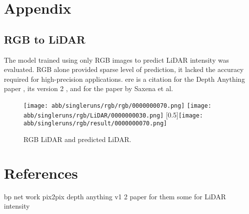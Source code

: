 \section{Appendix}
\subsection{RGB to LiDAR}

The model trained using only RGB images to predict LiDAR intensity was evaluated. RGB alone provided sparse level of prediction, it lacked the accuracy required for high-precision applications. ere is a citation for the Depth Anything paper \cite{depthanything}, its version 2 \cite{depth_anything_v2}, and for the paper by Saxena et al. \cite{saxena2008depth}
\begin{figure}[!ht]
	\centering
	\texttt{[image: abb/singleruns/rgb/rgb/0000000070.png]}
	\texttt{[image: abb/singleruns/rgb/LiDAR/0000000030.png]}
	\scalebox{2}[0.5]{\texttt{[image: abb/singleruns/rgb/result/0000000070.png]}}
	\caption{RGB LiDAR and predicted LiDAR.}
	\label{rgb}
\end{figure}


\section{References}
bp net work
pix2pix
depth anything v1 2
paper for them 
some for LiDAR intensity

